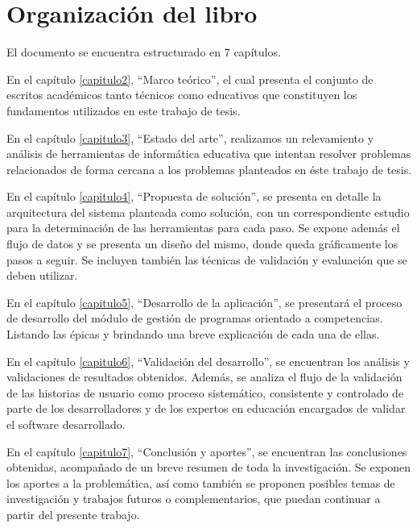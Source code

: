 \section{Organización del libro}
El documento se encuentra estructurado en 7 capítulos. 

En el capítulo \ref{capitulo2}, \enquote{Marco teórico}, el cual presenta el conjunto de escritos académicos tanto técnicos como educativos que constituyen los fundamentos utilizados en este trabajo de tesis.

En el capítulo \ref{capitulo3}, \enquote{Estado del arte}, realizamos un relevamiento y análisis de herramientas de informática educativa que intentan resolver problemas relacionados de forma cercana a los problemas planteados en éste trabajo de tesis.

En el capítulo \ref{capitulo4}, \enquote{Propuesta de solución}, se presenta en detalle la arquitectura del sistema planteada como solución, con un correspondiente estudio para la determinación de las herramientas para cada paso. Se expone además el flujo de datos y se presenta un diseño del mismo, donde queda gráficamente los pasos a seguir. Se incluyen también las técnicas de validación y evaluación que se deben utilizar.

En el capítulo \ref{capitulo5}, \enquote{Desarrollo de la aplicación}, se presentará el proceso de desarrollo del módulo de gestión de programas orientado a competencias. Listando las épicas y brindando una breve explicación de cada una de ellas.

En el capítulo \ref{capitulo6}, \enquote{Validación del desarrollo}, se encuentran los análisis y validaciones de resultados obtenidos. Además, se analiza el flujo de la validación de las historias de usuario como proceso sistemático, consistente y controlado de parte de los desarrolladores y de los expertos en educación encargados de validar el software desarrollado.

En el capítulo \ref{capitulo7}, \enquote{Conclusión y aportes}, se encuentran las conclusiones obtenidas, acompañado de un breve resumen de toda la investigación. Se exponen los aportes a la problemática, así como también se proponen posibles temas de investigación y trabajos futuros o complementarios, que puedan continuar a partir del presente trabajo.
